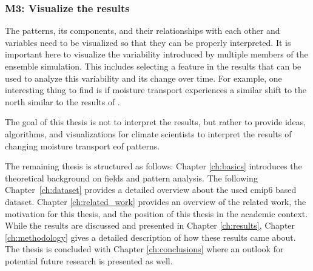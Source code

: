 \subsubsection{M3: Visualize the results}

The patterns, its components, and their relationships with each other and variables need to be visualized so that they can be properly interpreted. 
It is important here to visualize the variability introduced by multiple members of the ensemble simulation.  
This includes selecting a feature in the results that can be used to analyze this variability and its change over time. 
For example, one interesting thing to find is if moisture transport experiences a similar shift to the north similar to the results of .

The goal of this thesis is not to interpret the results, but rather to provide ideas, algorithms, and visualizations for climate scientists to interpret the results of changing moisture transport \ac{eof} patterns. 




\vspace{.3cm}
The remaining thesis is structured as follows: Chapter \ref{ch:basics} introduces the theoretical background on fields and pattern analysis. 
The following Chapter~\ref{ch:dataset} provides a detailed overview about the used \ac{cmip}6 based dataset. 
Chapter \ref{ch:related_work} provides an overview of the related work, the motivation for this thesis, and the position of this thesis in the academic context. 
While the results are discussed and presented in Chapter \ref{ch:results}, Chapter \ref{ch:methodology} gives a detailed description of how these results came about. 
The thesis is concluded with Chapter \ref{ch:conclusions} where an outlook for potential future research is presented as well. 



